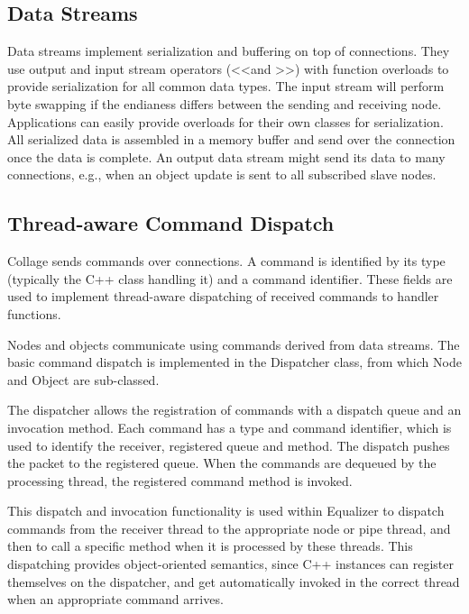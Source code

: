 \subsection{Data Streams}

Data streams implement serialization and buffering on top of connections. They
use output and input stream operators (\textless\textless and
\textgreater\textgreater) with function overloads to provide serialization for
all common data types. The input stream will perform byte swapping if the
endianess differs between the sending and receiving node. Applications can
easily provide overloads for their own classes for serialization. All
serialized data is assembled in a memory buffer and send over the connection
once the data is complete. An output data stream might send its data to many
connections, e.g., when an object update is sent to all subscribed slave nodes.

\subsection{Thread-aware Command Dispatch}

Collage sends commands over connections. A command is identified by its type
(typically the C++ class handling it) and a command identifier. These fields
are used to implement thread-aware dispatching of received commands to handler
functions.

Nodes and objects communicate using commands derived from data streams. The
basic command dispatch is implemented in the \textsf{Dispatcher} class, from
which \textsf{Node} and \textsf{Object} are sub-classed.

The dispatcher allows the registration of commands with a dispatch queue and an
invocation method. Each command has a type and command identifier, which is
used to identify the receiver, registered queue and method. The dispatch pushes
the packet to the registered queue. When the commands are dequeued by the
processing thread, the registered command method is invoked.

This dispatch and invocation functionality is used within Equalizer to dispatch
commands from the receiver thread to the appropriate node or pipe thread, and
then to call a specific method when it is processed by these threads. This
dispatching provides object-oriented semantics, since C++ instances can
register themselves on the dispatcher, and get automatically invoked in the
correct thread when an appropriate command arrives.


